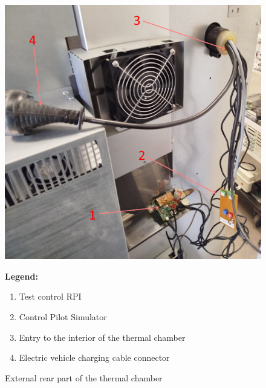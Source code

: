 \begin{figure}[H]
    \centering
    \begin{minipage}{0.6\textwidth}
        \includegraphics[width=\linewidth]{figures/inst_inside_3.png}
    \end{minipage}%
    \hfill
    \begin{minipage}{0.35\textwidth}
        \small
        \textbf{Legend:}
        \begin{enumerate}
            \item Test control RPI
            \item Control Pilot Simulator
            \item Entry to the interior of the thermal chamber
            \item Electric vehicle charging cable connector
        \end{enumerate}
    \end{minipage}
    \caption{External rear part of the thermal chamber}
    \label{fig:inst_inside_3}
\end{figure}

